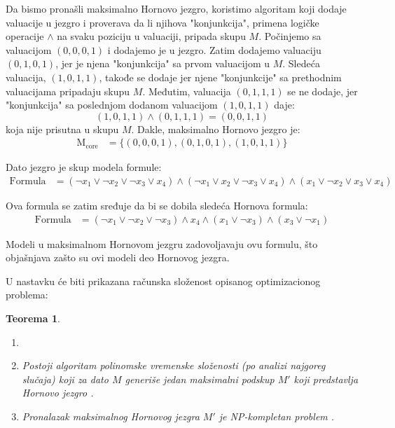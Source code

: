 \documentclass[12pt,oneside]{memoir}
\newtheorem{theorem}{Teorema}
\begin{document}
Da bismo pronašli maksimalno Hornovo jezgro, koristimo algoritam koji dodaje valuacije u jezgro i proverava da li njihova "konjunkcija", primena logičke operacije $\land$ na svaku poziciju u valuaciji, pripada skupu \(M\). Počinjemo sa valuacijom \((0, 0, 0, 1)\) i dodajemo je u jezgro. Zatim dodajemo valuaciju \((0, 1, 0, 1)\), jer je njena "konjunkcija" sa prvom valuacijom u \(M\). Sledeća valuacija, \((1, 0, 1, 1)\), takođe se dodaje jer njene "konjunkcije" sa prethodnim valuacijama pripadaju skupu \(M\). Međutim, valuacija \((0, 1, 1, 1)\) se ne dodaje, jer "konjunkcija" sa poslednjom dodanom valuacijom \((1, 0, 1, 1)\) daje:
\[
(1, 0, 1, 1) \land (0, 1, 1, 1) = (0, 0, 1, 1)
\] koja nije prisutna u skupu \(M\). Dakle, maksimalno Hornovo jezgro je:
\begin{align*}
\text{M}_{\text{core}} &= \{ (0, 0, 0, 1), (0, 1, 0, 1), (1, 0, 1, 1) \}
\end{align*}

Dato jezgro je skup modela formule:
\begin{align*}
\text{Formula} &= (\neg x_1 \lor \neg x_2 \lor \neg x_3 \lor x_4) \land (\neg x_1 \lor  x_2 \lor \neg x_3 \lor x_4) \land (x_1 \lor \neg x_2 \lor x_3 \lor x_4)
\end{align*}

Ova formula se zatim sređuje da bi se dobila sledeća Hornova formula:
\begin{align*}
\text{Formula} &= (\neg x_1 \lor \neg x_2 \lor \neg x_3) \land x_4 \land (x_1 \lor \neg x_3) \land (x_3 \lor \neg x_1)
\end{align*}

Modeli u maksimalnom Hornovom jezgru zadovoljavaju ovu formulu, što objašnjava zašto su ovi modeli deo Hornovog jezgra.

U nastavku će biti prikazana računska složenost opisanog optimizacionog problema:

\begin{theorem} 
    \begin{enumerate}[label=(\alph*)]
        \item[] 
        \item Postoji algoritam polinomske vremenske složenosti (po analizi najgoreg slučaja) koji za dato $M$ generiše jedan maksimalni podskup $M'$ koji predstavlja Hornovo jezgro \cite{doc3}.
        \item  Pronalazak maksimalnog Hornovog jezgra $M'$ je NP-kompletan problem \cite{doc3}.
    \end{enumerate}
\end{theorem}
\end{document}
